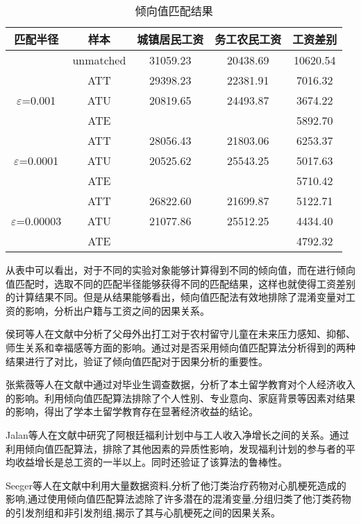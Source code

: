 \begin{table}[h]
  \centering
  \caption{倾向值匹配结果} 
  \label{匹配}
  \begin{tabular}{|c|c|c|c|c|}\hline
   匹配半径 & 样本 & 城镇居民工资 & 务工农民工资&工资差别 \\ \hline
 & unmatched & 31059.23 & 20438.69 & 10620.54 \\ \hline
  & ATT & 29398.23 &22381.91 & 7016.32\\ 
  $\varepsilon$=0.001& ATU & 20819.65 &24493.87 & 3674.22\\ 
  & ATE &  & & 5892.70\\ \hline
  & ATT & 28056.43 &21803.06 & 6253.37\\ 
  $\varepsilon$=0.0001& ATU & 20525.62 &25543.25 & 5017.63\\ 
  & ATE &  & & 5710.42\\ \hline
  & ATT & 26822.60 &21699.87 & 5122.71\\ 
  $\varepsilon$=0.00003&ATU & 21077.86&25512.25 & 4434.40\\ 
  & ATE &  & & 4792.32\\ \hline
  \end{tabular}
\end{table}

从表中可以看出，对于不同的实验对象能够计算得到不同的倾向值，而在进行倾向值匹配时，选取不同的匹配半径能够获得不同的匹配结果，这样也就使得工资差别的计算结果不同。但是从结果能够看出，倾向值匹配法有效地排除了混淆变量对工资的影响，分析出户籍与工资之间的因果关系。

侯珂等人在文献\cite{侯珂2014留守对农村儿童青少年社会适应的影响}中分析了父母外出打工对于农村留守儿童在未来压力感知、抑郁、师生关系和幸福感等方面的影响。通过对是否采用倾向值匹配算法分析得到的两种结果进行了对比，验证了倾向值匹配对于因果分析的重要性。

张紫薇等人在文献\cite{张紫薇2016大学本土留学教育个人收益的计量分析}中通过对毕业生调查数据，分析了本土留学教育对个人经济收入的影响。利用倾向值匹配算法排除了个人性别、专业意向、家庭背景等因素对结果的影响，得出了学本土留学教育存在显著经济收益的结论。

Jalan等人在文献\cite{jalan2003estimating}中研究了阿根廷福利计划中与工人收入净增长之间的关系。通过利用倾向值匹配算法，排除了其他因素的异质性影响，发现福利计划的参与者的平均收益增长是总工资的一半以上。同时还验证了该算法的鲁棒性。

Seeger等人在文献\cite{seeger2005application}中利用大量数据资料,分析了他汀类治疗药物对心肌梗死造成的影响,通过使用倾向值匹配算法滤除了许多潜在的混淆变量,分组归类了他汀类药物的引发剂组和非引发剂组,揭示了其与心肌梗死之间的因果关系。

